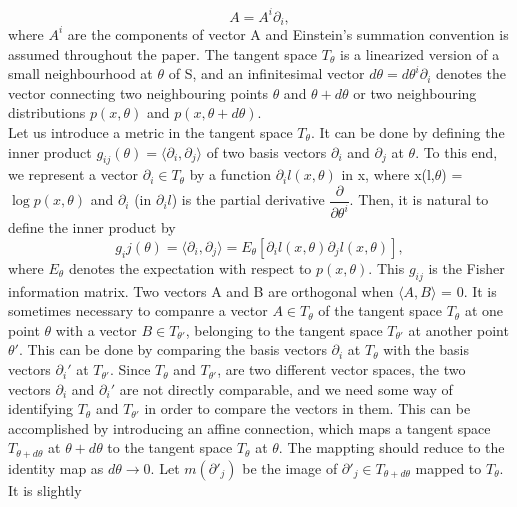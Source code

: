 \begin{equation*}
 A = A^{i} \partial_{i},
\end{equation*}
where $A^{i}$ are the components of vector A and Einstein's summation convention is assumed throughout the paper.
  The tangent space $T_\theta$ is a linearized version of a small neighbourhood at $\theta$ of S, and an infinitesimal
  vector $d\theta = d\theta^{i}\partial_{i}$ denotes the vector connecting two neighbouring points $\theta$ and 
  $\theta + d \theta$ or two neighbouring distributions $p(x,\theta)$ and $p(x, \theta + d \theta)$.
    \\\;\; Let us introduce a metric in the tangent space $T_{\theta}$. It can be done by defining the inner 
   product $g_{ij}(\theta)= \langle \partial_i, \partial_j \rangle$ of two basis vectors $\partial_i$ and $\partial_j$
  at $\theta$. To this end, we represent a vector $\partial_i \in T_\theta$ by a function $\partial_i l(x,\theta)$ in x,
  where x(l,$\theta$) = $\log p(x,\theta)$ and $\partial_i$ (in $\partial_i l$) is the partial derivative
  $\dfrac{\partial}{\partial \theta ^{i}}$. Then, it is natural to define the inner product by 
  \begin{equation}
   g_ij(\theta) = \langle \partial_i, \partial_j \rangle = E_{\theta} [\partial_i l(x,\theta)\partial_j l(x,\theta)],
  \end{equation}
where $E_{\theta}$ denotes the expectation with respect to $p(x,\theta)$. This $g_{ij}$ is the Fisher information matrix.
Two vectors A and B are orthogonal when $\langle A, B \rangle$ = 0. 
    It is sometimes necessary to companre a vector $A \in T_{\theta}$ of the tangent space $T_{\theta}$ at one 
    point $\theta$ with a vector $B \in T_{\theta'}$, belonging to the tangent space $T_{\theta '}$ at another 
    point $\theta '$.
This can be done by comparing the basis vectors $\partial_i$ at $T_\theta$ with the basis vectors $\partial_{i}'$ at
$T_{\theta '}$. Since $T_{\theta}$ and $T_{\theta '}$, are two different vector spaces, the two vectors $\partial_{i}$
and $\partial_{i}'$ are not directly comparable, and we need some way of identifying $T_{\theta}$ and $T_{\theta '}$
in order to compare the vectors in them. This can be accomplished by introducing an affine connection,
which maps a tangent space $T_{\theta + d \theta}$ at $\theta + d\theta$ to the tangent space $T_{\theta}$ at 
$\theta$. The mappting should reduce to the identity map as $d\theta \rightarrow 0$. Let $m\left(\partial '_{j}\right)$ 
be the image of $\partial '_{j} \in T_{\theta + d \theta}$ mapped to $T_{\theta}$. It is slightly 
